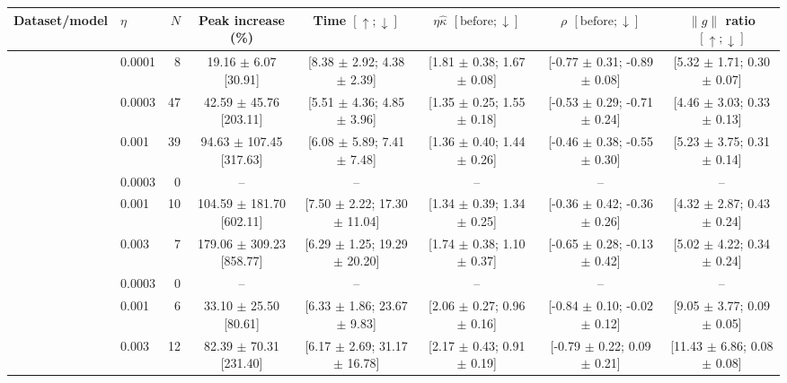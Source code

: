 \begin{tabular}{llrccccc}
\hline
Dataset/model & $\eta$ & $N$ & Peak increase (\%) & Time $[\uparrow;\downarrow]$ & $\eta\widehat\kappa$ $[\mathrm{before};\downarrow]$ & $\rho$ $[\mathrm{before};\downarrow]$ & $\|g\|$ ratio $[\uparrow;\downarrow]$ \\
\hline
{} & 0.0001 & 8 & 19.16 $\pm$ 6.07 [30.91] & [8.38 $\pm$ 2.92; 4.38 $\pm$ 2.39] & [1.81 $\pm$ 0.38; 1.67 $\pm$ 0.08] & [-0.77 $\pm$ 0.31; -0.89 $\pm$ 0.08] & [5.32 $\pm$ 1.71; 0.30 $\pm$ 0.07] \\
 & 0.0003 & 47 & 42.59 $\pm$ 45.76 [203.11] & [5.51 $\pm$ 4.36; 4.85 $\pm$ 3.96] & [1.35 $\pm$ 0.25; 1.55 $\pm$ 0.18] & [-0.53 $\pm$ 0.29; -0.71 $\pm$ 0.24] & [4.46 $\pm$ 3.03; 0.33 $\pm$ 0.13] \\
 & 0.001 & 39 & 94.63 $\pm$ 107.45 [317.63] & [6.08 $\pm$ 5.89; 7.41 $\pm$ 7.48] & [1.36 $\pm$ 0.40; 1.44 $\pm$ 0.26] & [-0.46 $\pm$ 0.38; -0.55 $\pm$ 0.30] & [5.23 $\pm$ 3.75; 0.31 $\pm$ 0.14] \\
\hline
{} & 0.0003 & 0 & -- & -- & -- & -- & -- \\
 & 0.001 & 10 & 104.59 $\pm$ 181.70 [602.11] & [7.50 $\pm$ 2.22; 17.30 $\pm$ 11.04] & [1.34 $\pm$ 0.39; 1.34 $\pm$ 0.25] & [-0.36 $\pm$ 0.42; -0.36 $\pm$ 0.26] & [4.32 $\pm$ 2.87; 0.43 $\pm$ 0.24] \\
 & 0.003 & 7 & 179.06 $\pm$ 309.23 [858.77] & [6.29 $\pm$ 1.25; 19.29 $\pm$ 20.20] & [1.74 $\pm$ 0.38; 1.10 $\pm$ 0.37] & [-0.65 $\pm$ 0.28; -0.13 $\pm$ 0.42] & [5.02 $\pm$ 4.22; 0.34 $\pm$ 0.24] \\
\hline
{} & 0.0003 & 0 & -- & -- & -- & -- & -- \\
 & 0.001 & 6 & 33.10 $\pm$ 25.50 [80.61] & [6.33 $\pm$ 1.86; 23.67 $\pm$ 9.83] & [2.06 $\pm$ 0.27; 0.96 $\pm$ 0.16] & [-0.84 $\pm$ 0.10; -0.02 $\pm$ 0.12] & [9.05 $\pm$ 3.77; 0.09 $\pm$ 0.05] \\
 & 0.003 & 12 & 82.39 $\pm$ 70.31 [231.40] & [6.17 $\pm$ 2.69; 31.17 $\pm$ 16.78] & [2.17 $\pm$ 0.43; 0.91 $\pm$ 0.19] & [-0.79 $\pm$ 0.22; 0.09 $\pm$ 0.21] & [11.43 $\pm$ 6.86; 0.08 $\pm$ 0.08] \\
\hline
\end{tabular}
